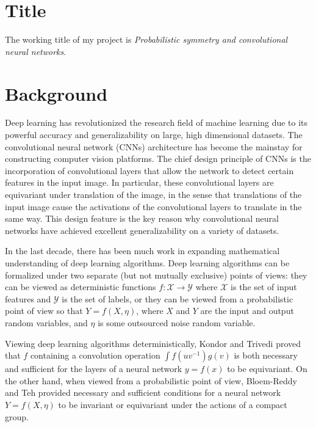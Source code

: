 \documentclass[]{STAT_547C}
\begin{document}
\vspace{-2cm}


\section{Title}

The working title of my project is \emph{Probabilistic symmetry and convolutional neural networks}.  

\section{Background}

Deep learning has revolutionized the research field of machine learning due to its powerful accuracy and generalizability on large, high dimensional datasets.
The convolutional neural network (CNNs) architecture has become the mainstay for constructing computer vision platforms.
The chief design principle of CNNs is the incorporation of convolutional layers that allow the network to detect certain features in the input image.
In particular, these convolutional layers are equivariant under translation of the image, in the sense that translations of the input image cause the activations of the convolutional layers to translate in the same way.
This design feature is the key reason why convolutional neural networks have achieved excellent generalizability on a variety of datasets.

In the last decade, there has been much work in expanding mathematical understanding of deep learning algorithms.
Deep learning algorithms can be formalized under two separate (but not mutually exclusive) points of views: they can be viewed as deterministic functions $f: \mathcal{X} \to \mathcal{Y}$ where $\mathcal{X}$ is the set of input features and $\mathcal{Y}$ is the set of labels, or they can be viewed from a probabilistic point of view so that $Y = f(X, \eta)$, where $X$ and $Y$ are the input and output random variables, and $\eta$ is some outsourced noise random variable.

Viewing deep learning algorithms deterministically, Kondor and Trivedi \cite{kondor2018generalization} proved that $f$ containing a convolution operation $\int f(uv^{-1})g(v)$ is both necessary and sufficient for the layers of a neural network $y = f(x)$ to be equivariant.
On the other hand, when viewed from a probabilistic point of view, Bloem-Reddy and Teh \cite{bloemreddy2019probabilistic} provided necessary and sufficient conditions for a neural network $Y = f(X, \eta)$ to be invariant or equivariant under the actions of a compact group.
\end{document}
